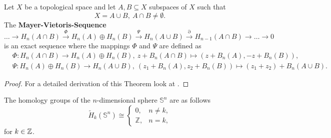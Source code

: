 \begin{thm}\label{thm:mvs}
  Let $X$ be a topological space and let $A, B \subseteq X$ subspaces of $X$ such that \[X = A \cup B, \: A \cap B \neq \emptyset.\]
  The \textbf{Mayer-Vietoris-Sequence}
  \begin{equation*}
    \ldots \to H_n(A\cap B) \overset{\Phi}{\to} H_n(A) \oplus H_n(B) \overset{\Psi}{\to} H_n(A \cup B) \overset{\partial}{\to} H_{n-1}(A\cap B) \to \ldots \to 0
  \end{equation*}
  is an exact sequence where the mappings $\Phi$ and $\Psi$ are defined as
  \begin{align*}
    &\Phi\colon H_n(A\cap B) \to H_n(A) \oplus H_n(B),\: z + B_n(A\cap B) \mapsto (z+B_n(A), -z + B_n(B)), \\
    &\Psi\colon H_n(A) \oplus H_n(B) \to H_n(A\cup B), \: (z_1+ B_n(A), z_2 + B_n(B)) \mapsto (z_1 + z_2) + B_n(A \cup B).
  \end{align*}
\end{thm}

\begin{proof}
  For a detailed derivation of this Theorem look at \cite[p. 149]{hatcher}. 
\end{proof}

\vspace*{-17px}

\begin{ex}
  The homology groups of the $n$-dimensional sphere $\mathbb{S}^n$ are as follows
  \begin{equation*}
    \tilde{H}_k(\mathbb{S}^n) \cong \begin{cases}
      0, &n \neq k, \\
      \mathbb{Z}, &n = k,
    \end{cases}
  \end{equation*}
  for $k \in \mathbb{Z}$.
\end{ex}

